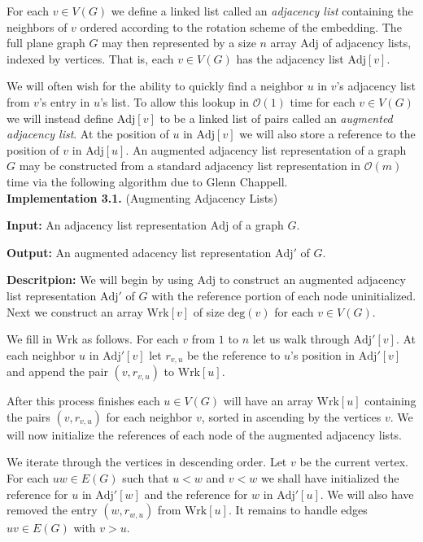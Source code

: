 \documentclass[letterpaper, 12pt]{amsart}
\theoremstyle{definition}
\theoremstyle{definition}
\theoremstyle{thm}
\theoremstyle{definition}
\begin{document}
For each $v\in V(G)$ we define a linked list called an
\emph{adjacency list} containing the neighbors of $v$ ordered according to
the rotation scheme of the embedding. The full plane graph $G$ may then
represented by a size $n$ array $\text{Adj}$ of adjacency lists, indexed by vertices.
That is, each $v\in V(G)$ has the adjacency list $\text{Adj}[v]$.

We will often wish for the ability to quickly find a neighbor $u$
in $v$'s adjacency list from $v$'s entry in $u$'s list. To allow this lookup in
$\mathcal{O}(1)$ time for each $v\in V(G)$ we will instead define $\text{Adj}[v]$
to be a linked list of pairs called an \textit{augmented adjacency list}.
At the position of $u$ in $\text{Adj}[v]$ we will also store a reference to
the position of $v$ in $\text{Adj}[u]$. An augmented adjacency list
representation of a graph $G$ may be constructed from a standard adjacency list
representation in $\mathcal{O}(m)$ time via the following algorithm due to 
Glenn Chappell.\\

\noindent\textbf{Implementation 3.1.} (Augmenting Adjacency Lists)

\noindent\textbf{Input:} An adjacency list representation $\text{Adj}$ of a
graph $G$.

\noindent\textbf{Output:} An augmented adacency list representation
$\text{Adj}'$ of $G$.

\noindent\textbf{Descritpion:} We will begin by using $\text{Adj}$ to construct
an augmented adjacency list representation $\text{Adj}'$ of $G$ with the
reference portion of each node uninitialized.
Next we construct an array $\text{Wrk}[v]$ of size $\text{deg}(v)$ for each
$v\in V(G)$.

We fill in $\text{Wrk}$ as follows. For each $v$ from $1$ to $n$ let us walk
through $\text{Adj}'[v]$. At each neighbor $u$ in $\text{Adj}'[v]$ let
$r_{v,u}$ be the reference to $u$'s position in $\text{Adj}'[v]$ and append the
pair $(v,r_{v,u})$ to $\text{Wrk}[u]$.

After this process finishes each $u\in V(G)$ will have an array $\text{Wrk}[u]$
containing the pairs $(v,r_{v,u})$ for each neighbor $v$, sorted in ascending by
the vertices $v$. We will now initialize the references of each node of the
augmented adjacency lists.

We iterate through the vertices in descending order. Let $v$ be the current
vertex. For each 
$uw\in E(G)$ such that $u<w$ and $v<w$ we shall have initialized the reference
for $u$ in $\text{Adj}'[w]$ and the reference for $w$ in $\text{Adj}'[u]$. We
will also have removed the entry $(w,r_{w,u})$ from $\text{Wrk}[u]$. It remains
to handle edges $uv\in E(G)$ with $v>u$.
\end{document}
